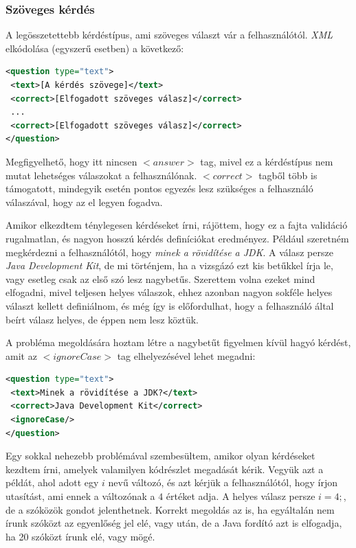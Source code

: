 \documentclass[12pt,a4paper]{article}
\newcommand{\xml}{\textit{XML}\xspace}
\begin{document}
	\subsubsection{Szöveges kérdés}
	
	A legösszetettebb kérdéstípus, ami szöveges választ vár a felhasználótól. \xml elkódolása (egyszerű esetben) a következő:
	
	\bigskip
	\begin{lstlisting}[language=XML]
<question type="text">
 <text>[A kérdés szövege]</text>
 <correct>[Elfogadott szöveges válasz]</correct>
 ...
 <correct>[Elfogadott szöveges válasz]</correct>
</question>
	\end{lstlisting}
	\bigskip
	
	\noindent
	Megfigyelhető, hogy itt nincsen $<answer>$ tag, mivel ez a kérdéstípus nem mutat lehetséges válaszokat a felhasználónak. $<correct>$ tagből több is támogatott, mindegyik esetén pontos egyezés lesz szükséges a felhasználó válaszával, hogy az el legyen fogadva.
	
	Amikor elkezdtem ténylegesen kérdéseket írni, rájöttem, hogy ez a fajta validáció rugalmatlan, és nagyon hosszú kérdés definíciókat eredményez. Például szeretném megkérdezni a felhasználótól, hogy \textit{minek a rövidítése a JDK}. A válasz persze \textit{Java Development Kit}, de mi történjem, ha a vizsgázó ezt kis betűkkel írja le, vagy esetleg csak az első szó lesz nagybetűs. Szerettem volna ezeket mind elfogadni, mivel teljesen helyes válaszok, ehhez azonban nagyon sokféle helyes választ kellett definiálnom, és még így is előfordulhat, hogy a felhasználó által beírt válasz helyes, de éppen nem lesz köztük.
	
	A probléma megoldására hoztam létre a nagybetűt figyelmen kívül hagyó kérdést, amit az $<ignoreCase>$ tag elhelyezésével lehet megadni:
	
	\begin{lstlisting}[language=XML]	
<question type="text">
 <text>Minek a rövidítése a JDK?</text>
 <correct>Java Development Kit</correct>
 <ignoreCase/>
</question>
	\end{lstlisting}
	
	\noindent
	Egy sokkal nehezebb problémával szembesültem, amikor olyan kérdéseket kezdtem írni, amelyek valamilyen kódrészlet megadását kérik. Vegyük azt a példát, ahol adott egy $i$ nevű változó, és azt kérjük a felhasználótól, hogy írjon utasítást, ami ennek a változónak a $4$ értéket adja. A helyes válasz persze $i = 4;$, de a szóközök gondot jelenthetnek. Korrekt megoldás az is, ha egyáltalán nem írunk szóközt az egyenlőség jel elé, vagy után, de a Java fordító azt is elfogadja, ha 20 szóközt írunk elé, vagy mögé.
	
\end{document}
